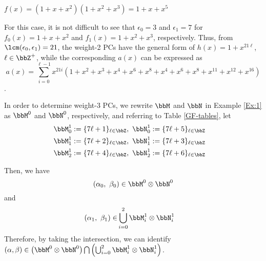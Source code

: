 \begin{example}
$f(x)=(1+x+x^2)(1+x^2+x^3)=1+x+x^5$

For this case, it is not difficult to see that $\epsilon_0=3$ and $\epsilon_1=7$ for $f_0(x)=1+x+x^2$ and $f_1(x)=1+x^2+x^3$, respectively. Thus, from $\lcm(\epsilon_0,\epsilon_1)=21$, the weight-2 PCs have the general form of $h(x)=1+x^{21\ell}$, $\ell \in \bbZ^+$, while the corresponding $a(x)$ can be expressed as $$a(x)=\sum_{i=0}^{\ell-1} x^{21i}(1+x^2+x^3+x^4+x^6+x^8+x^{4}+x^{6}+x^{8}+x^{11}+x^{12}+x^{16})$$.


In order to determine weight-3 PCs, we rewrite $\bbM$ and $\bbN$ in Example \ref{Ex:1} as $\bbM^0$ and $\bbN^0$, respectively,
and referring to Table \ref{GF-tables}, let
\begin{align}
	\bbM_0^1 &:= \{7\ell + 1\}_{\ell \in \bbZ},~\bbN_0^1 := \{7\ell + 5\}_{\ell \in \bbZ}\cr
	\bbM_1^1 &:= \{7\ell + 2\}_{\ell \in \bbZ},~\bbN_1^1 := \{7\ell + 3\}_{\ell \in \bbZ}\cr
	\bbM_2^1 &:= \{7\ell + 4\}_{\ell \in \bbZ},~\bbN_2^1 := \{7\ell + 6\}_{\ell \in \bbZ}
\end{align}

Then, we have
\[
(\alpha_0,~\beta_0) \in \bbM^0\otimes\bbN^0 
\]
and
\begin{equation*}
\begin{split}
(\alpha_1,~\beta_1) \in &\bigcup_{i=0}^2 \bbM_i^1\otimes\bbN_i^1 
\end{split}
\end{equation*}
Therefore, by taking the intersection, we can identify $(\alpha,\beta) \in \left(\bbM^0\otimes\bbN^0\right)\bigcap\left(\bigcup_{i=0}^2 \bbM_i^1\otimes\bbN_i^1 \right) $.
\label{Ex:6}
\end{example}

